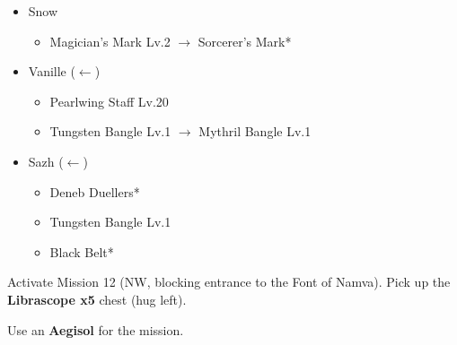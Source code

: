 \begin{menu}
\begin{itemize}
		\equip
		\begin{itemize}
			\item Snow
				\begin{itemize}
					\item Magician's Mark Lv.2 $\rightarrow$ Sorcerer's Mark*
				\end{itemize}
			\item Vanille ($\leftarrow$)
			      \begin{itemize}
				      \item Pearlwing Staff Lv.20
				      \item Tungsten Bangle Lv.1 $\rightarrow$ Mythril Bangle Lv.1
			      \end{itemize}
			\item Sazh ($\leftarrow$)
			      \begin{itemize}
				      \item Deneb Duellers*
				      \item Tungsten Bangle Lv.1
				      \item Black Belt*
			      \end{itemize}
		\end{itemize}
	\end{itemize}
\end{menu}

\renewcommand{\first}{[1] Hero's Charge (\syn/\med/\com)}
\renewcommand{\second}{[2] Tri-Disaster (\rav/\rav/\rav)}
\renewcommand{\third}{[3] Hero's Charge (\syn/\med/\com)}
\renewcommand{\fourth}{[4] Guerilla (\syn/\sab/\rav)}
\renewcommand{\fifth}{[5] Aggression (\com/\rav/\com)}
\renewcommand{\sixth}{[6] Relentless Assault (\rav/\rav/\com)}

Activate Mission 12 (NW, blocking entrance to the Font of Namva).
Pick up the \textbf{Librascope x5} chest (hug left).

Use an \textbf{Aegisol} for the mission.

